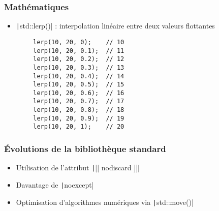 \documentclass[C++.tex]{subfiles}
\begin{document}
\begin{frame}[fragile]
\frametitle{Mathématiques}
	\begin{itemize}
		\item \texttt|std::lerp()| : interpolation linéaire entre deux valeurs flottantes
	\end{itemize}

	\begin{verbatim}
		lerp(10, 20, 0);    // 10
		lerp(10, 20, 0.1);  // 11
		lerp(10, 20, 0.2);  // 12
		lerp(10, 20, 0.3);  // 13
		lerp(10, 20, 0.4);  // 14
		lerp(10, 20, 0.5);  // 15
		lerp(10, 20, 0.6);  // 16
		lerp(10, 20, 0.7);  // 17
		lerp(10, 20, 0.8);  // 18
		lerp(10, 20, 0.9);  // 19
		lerp(10, 20, 1);    // 20
	\end{verbatim}


\end{frame}

\begin{frame}[fragile]
	\frametitle{Évolutions de la bibliothèque standard}
	\begin{itemize}
		\item Utilisation de l'attribut \texttt|[[ nodiscard ]]|
		\item Davantage de \texttt|noexcept|
		\item Optimisation d'algorithmes numériques via \texttt|std::move()|
	\end{itemize}
\end{frame}
\end{document}
